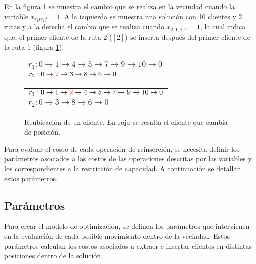\documentclass[12pt]{report}
\begin{document}
      En la figura \ref{fig:Cambio reinsercion de un cliente} se muestra el cambio que se realiza en la vecindad cuando la variable $x_{r_1ir_2j}=1$. A la izquierda se muestra una solución con 10 clientes y 2 rutas y a la derecha el cambio que se realiza cuando $x_{2,1,1,1} =1$, la cual indica que, el primer cliente de la ruta 2 (\([2]\)) se inserta después del primer cliente de la ruta 1 (figura \ref{fig:Cambio reinsercion de un cliente}).
      \begin{figure}[h!]
      	\centering
      	\begin{minipage}{0.45\textwidth}
      		\begin{tabular}{l}
      			$r_1:  0 \rightarrow 1\rightarrow 4 \rightarrow 5 \rightarrow 7 \rightarrow 9 \rightarrow 10 \rightarrow  0$\\
      			$r_2:  0\rightarrow \textcolor{red}{2} \rightarrow 3\rightarrow 8 \rightarrow 6 \rightarrow  0$\\
      		\end{tabular}
      	\end{minipage}
      	\hfill
      	\begin{minipage}{0.45\textwidth}
      		\begin{tabular}{l}
      			$r_1:  0 \rightarrow 1\rightarrow \textcolor{red}{2}\rightarrow 4 \rightarrow 5 \rightarrow 7 \rightarrow 9 \rightarrow 10 \rightarrow 0$\\
      			$r_2:  0\rightarrow 3\rightarrow 8 \rightarrow 6 \rightarrow 0$\\
      		\end{tabular}
      	\end{minipage}
      	\caption{Reubicación de un cliente. En rojo se resalta el cliente que cambia de posición.}
      	\label{fig:Cambio reinsercion de un cliente}
      \end{figure}

	Para evaluar el costo de cada operación de reinserción, se necesita definir los parámetros asociados a los costos de las operaciones descritas por las variables y los correspondientes a la restricción de capacidad. A continuación se detallan estos parámetros.

	\subsection{Parámetros}

	Para crear el modelo de optimización, se definen los parámetros que intervienen en la evaluación de cada posible movimiento dentro de la vecindad. Estos parámetros calculan los costos asociados a extraer e insertar clientes en distintas posiciones dentro de la solución.
\end{document}
